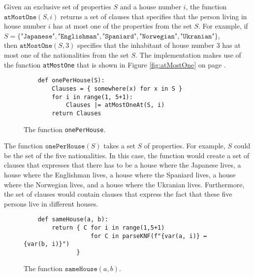 Given an exclusive set of properties $S$ and a house number $i$, the function
$\texttt{atMostOne}(S, i)$ returns a set of clauses that specifies that the
person living in house number $i$ has at most one of the properties from the set
$S$.  For example, if  
\\[0.2cm]
\hspace*{1.3cm}
$S = \{\texttt{"Japanese"}, \texttt{"Englishman"}, \texttt{"Spaniard"}, \texttt{"Norwegian"}, \texttt{"Ukranian"}\}$, 
\\[0.2cm]
then $\texttt{atMostOne}(S, 3)$ specifies that the inhabitant of house number 3
has at most one of the nationalities from the set $S$.   The implementation
makes use of the function \texttt{atMostOne} that is shown in Figure
\ref{fig:atMostOne} on page \pageref{fig:atMostOne}.

\begin{figure}[!ht]
\centering
\begin{verbatim}
    def onePerHouse(S):
        Clauses = { somewhere(x) for x in S } 
        for i in range(1, 5+1):
            Clauses |= atMostOneAt(S, i)
        return Clauses
\end{verbatim}
\vspace*{-0.3cm}
\caption{The function \texttt{onePerHouse}.}
\label{fig:onePerHouse}
\end{figure}

The function $\texttt{onePerHouse}(S)$ takes a set $S$ of properties.  For
example, $S$ could be the set of the five nationalities.
In this case, the function would create a set of clauses that expresses that
there has to be a house where the Japanese lives, a house where the Englishman
lives, a house where the Spaniard lives, a house where the Norwegian lives, and
a house where the Ukranian lives.  Furthermore, the set of clauses would contain
clauses that express the fact that these five persons live in different houses.


\begin{figure}[!ht]
\centering
\begin{verbatim}
    def sameHouse(a, b):
        return { C for i in range(1,5+1)
                   for C in parseKNF(f"{var(a, i)} ↔ {var(b, i)}") 
               }
\end{verbatim}
\vspace*{-0.3cm}
\caption{The function $\texttt{sameHouse}(a, b)$.}
\label{fig:sameHouse}
\end{figure}


